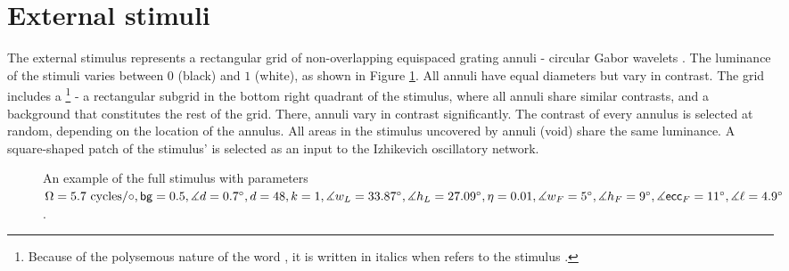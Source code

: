\section{External stimuli}
\label{sec:external-stimuli}

The external stimulus represents a rectangular grid of non-overlapping equispaced grating annuli - circular Gabor wavelets \cite{MaryamPLACEHOLDER}. The luminance of the stimuli varies between $0$ (black) and $1$ (white), as shown in Figure \ref{fig:full-stimulus-example}. All annuli have equal diameters but vary in contrast. The grid includes a \stimfig{}\footnote{Because of the polysemous nature of the word , it is written in italics when refers to the stimulus \stimfig.} - a rectangular subgrid in the bottom right quadrant of the stimulus, where all annuli share similar contrasts, and a background that constitutes the rest of the grid. There, annuli vary in contrast significantly. The contrast of every annulus is selected at random, depending on the location of the annulus. All areas in the stimulus uncovered by annuli (void) share the same luminance. A square-shaped patch of the stimulus' \stimfig{} is selected as an input to the Izhikevich oscillatory network.

\begin{figure}[!htp]
    \centering
    
    \caption[Full stimulus annotated]{An example of the full stimulus with parameters $ \Omega = 5.7 \text{ cycles}/\circ, \mathsf{bg} = 0.5, \measuredangle d = 0.7^\circ, d = 48, k = 1, \measuredangle w_L = 33.87^\circ, \measuredangle h_L = 27.09^\circ, \eta = 0.01, \measuredangle w_F = 5^\circ, \measuredangle h_F = 9^\circ, \measuredangle \mathsf{ecc}_F = 11^\circ, \measuredangle \ell = 4.9^\circ$.}
    \label{fig:full-stimulus-example}
\end{figure}



